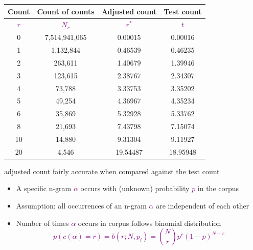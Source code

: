\documentclass[landscape]{slides}
\newcommand{\maths}[1]{\textcolor{purple}{#1}}
\begin{document}
\vspace{5mm}
\begin{center}
\begin{tabular}{|c|c|c|c|} \hline
\bf Count & \bf Count of counts & \bf Adjusted count & \bf Test count \\ \hline
\maths{$r$} & \maths{$N_r$} & \maths{$r^*$} & \maths{$t$}\\ \hline
  0 & 7,514,941,065 & 0.00015  & 0.00016\\ \hline
  1 & 1,132,844 & 0.46539 & 0.46235\\ \hline
  2 & 263,611 & 1.40679 & 1.39946\\ \hline
  3 & 123,615 & 2.38767 & 2.34307\\ \hline
  4 & 73,788 & 3.33753 & 3.35202\\ \hline
  5 & 49,254 & 4.36967 & 4.35234\\ \hline
  6 & 35,869 & 5.32928 & 5.33762\\ \hline
  8 & 21,693 & 7.43798 & 7.15074\\ \hline
 10 & 14,880 & 9.31304 & 9.11927\\ \hline
 20 & 4,546  & 19.54487 & 18.95948\\ \hline
\end{tabular}

\vspace{5mm}
adjusted count fairly accurate when compared against the test count
\end{center}


\vspace{25mm}
\begin{itemize}
\item A specific n-gram \maths{$\alpha$} occurs with (unknown) probability \maths{$p$} in the corpus
\item Assumption: all occurrences of an n-gram \maths{$\alpha$} are independent of each other
\item Number of times \maths{$\alpha$} occurs in corpus follows binomial distribution
\maths{\begin{equation*}
p(c(\alpha)=r) = b(r; N,p_i) = \binom{N}{r}p^r(1-p)^{N-r}
\end{equation*}}
\end{itemize}

\end{document}
